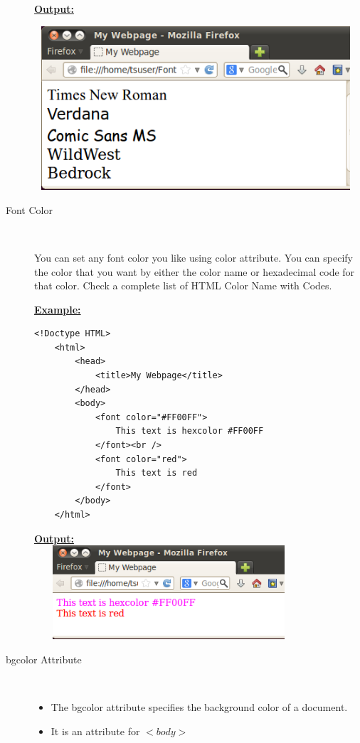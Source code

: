 \documentclass[11pt,a4paper]{article}
\begin{document}
\begin{description}
\underline{\textbf{Output:}}\

\includegraphics[height = 61mm, width = 120mm]{FontFace.png}\ 


\item[Font Color]\

You can set any font color you like using color attribute. You can specify the color that you want by either the color name or hexadecimal code for that color. Check a complete list of HTML Color Name with Codes.\

\underline{\textbf{Example:}}
\begin{verbatim}
<!Doctype HTML>
    <html>
        <head>
            <title>My Webpage</title>
        </head>
        <body>
            <font color="#FF00FF">
                This text is hexcolor #FF00FF
            </font><br />
            <font color="red">
                This text is red
            </font>
        </body>
    </html>
\end{verbatim}

\underline{\textbf{Output:}}\\

\includegraphics[height = 35mm, width = 100mm]{FontColor.png}\

\item[bgcolor Attribute]\
\begin{itemize}
\item The bgcolor attribute specifies the background color of a document.
\item It is an attribute for $<body>$
\end{itemize}


\end{description}
\end{document}
